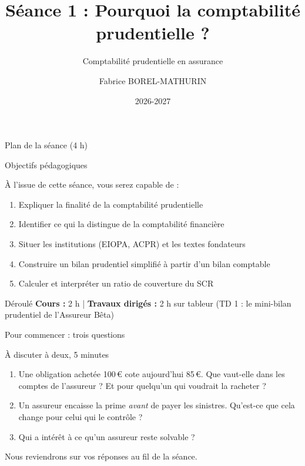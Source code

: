 \documentclass[10pt,aspectratio=169]{beamer}
\title[Séance 1 -- Pourquoi la comptabilité prudentielle ?]{Séance 1 : Pourquoi la comptabilité prudentielle ?}
\subtitle{Comptabilité prudentielle en assurance}
\author[F. Borel-Mathurin]{Fabrice BOREL-MATHURIN}
\institute[ACPR-DEAR et SAF Lyon 1]{
    ACPR - DEAR\\
    et\\
    Laboratoire SAF Université Claude Bernard Lyon 1
}
\date{2026-2027}
\begin{document}
\frame{\titlepage}

\begin{frame}{Plan de la séance (4 h)}
\tableofcontents
\end{frame}

\begin{frame}{Objectifs pédagogiques}
\begin{block}{À l'issue de cette séance, vous serez capable de :}
\begin{enumerate}
  \item Expliquer la finalité de la comptabilité prudentielle
  \item Identifier ce qui la distingue de la comptabilité financière
  \item Situer les institutions (EIOPA, ACPR) et les textes fondateurs
  \item Construire un bilan prudentiel simplifié à partir d'un bilan comptable
  \item Calculer et interpréter un ratio de couverture du SCR
\end{enumerate}
\end{block}
\vspace{0.3cm}
\begin{alertblock}{Déroulé}
\textbf{Cours :} 2 h \quad | \quad \textbf{Travaux dirigés :} 2 h sur tableur (TD 1 : le mini-bilan prudentiel de l'Assureur Bêta)
\end{alertblock}
\end{frame}

\begin{frame}{Pour commencer : trois questions}
\begin{block}{À discuter à deux, 5 minutes}
\begin{enumerate}
  \item Une obligation achetée 100\,\euro{} cote aujourd'hui 85\,\euro. Que vaut-elle dans les
        comptes de l'assureur ? Et pour quelqu'un qui voudrait la racheter ?
  \item Un assureur encaisse la prime \emph{avant} de payer les sinistres. Qu'est-ce que cela
        change pour celui qui le contrôle ?
  \item Qui a intérêt à ce qu'un assureur reste solvable ?
\end{enumerate}
\end{block}
\vspace{0.2cm}
\small Nous reviendrons sur vos réponses au fil de la séance.
\end{frame}

\end{document}
